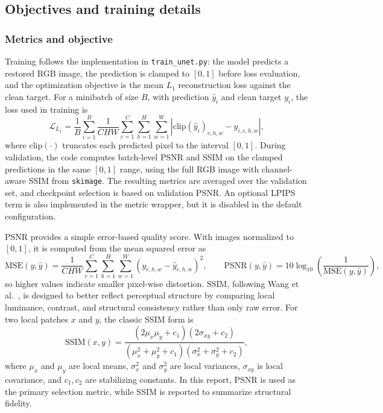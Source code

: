 \documentclass{article}
\begin{document}
\subsection{Objectives and training details}
\subsubsection{Metrics and objective}
Training follows the implementation in \texttt{train\_unet.py}: the model predicts a restored RGB image, the prediction is clamped to $[0,1]$ before loss evaluation, and the optimization objective is the mean $L_1$ reconstruction loss against the clean target. For a minibatch of size $B$, with prediction $\hat{y}_i$ and clean target $y_i$, the loss used in training is
\begin{equation}
\mathcal{L}_{L_1}
= \frac{1}{B} \sum_{i=1}^{B} \frac{1}{CHW}
\sum_{c=1}^{C} \sum_{h=1}^{H} \sum_{w=1}^{W}
\left|\mathrm{clip}(\hat{y}_i)_{c,h,w} - y_{i,c,h,w}\right|,
\end{equation}
where $\mathrm{clip}(\cdot)$ truncates each predicted pixel to the interval $[0,1]$. During validation, the code computes batch-level PSNR and SSIM on the clamped predictions in the same $[0,1]$ range, using the full RGB image with channel-aware SSIM from \texttt{skimage}. The resulting metrics are averaged over the validation set, and checkpoint selection is based on validation PSNR. An optional LPIPS term is also implemented in the metric wrapper, but it is disabled in the default configuration.

PSNR provides a simple error-based quality score. With images normalized to $[0,1]$, it is computed from the mean squared error as
\begin{equation}
\mathrm{MSE}(y,\hat{y}) = \frac{1}{CHW}\sum_{c=1}^{C}\sum_{h=1}^{H}\sum_{w=1}^{W}(y_{c,h,w}-\hat{y}_{c,h,w})^2,
\qquad
\mathrm{PSNR}(y,\hat{y}) = 10\log_{10}\!\left(\frac{1}{\mathrm{MSE}(y,\hat{y})}\right),
\end{equation}
so higher values indicate smaller pixel-wise distortion. SSIM, following Wang et al.~\citep{wang2004ssim}, is designed to better reflect perceptual structure by comparing local luminance, contrast, and structural consistency rather than only raw error. For two local patches $x$ and $y$, the classic SSIM form is
\begin{equation}
\mathrm{SSIM}(x,y)
= \frac{(2\mu_x\mu_y + c_1)(2\sigma_{xy} + c_2)}{(\mu_x^2 + \mu_y^2 + c_1)(\sigma_x^2 + \sigma_y^2 + c_2)},
\end{equation}
where $\mu_x$ and $\mu_y$ are local means, $\sigma_x^2$ and $\sigma_y^2$ are local variances, $\sigma_{xy}$ is local covariance, and $c_1,c_2$ are stabilizing constants. In this report, PSNR is used as the primary selection metric, while SSIM is reported to summarize structural fidelity.
\end{document}
